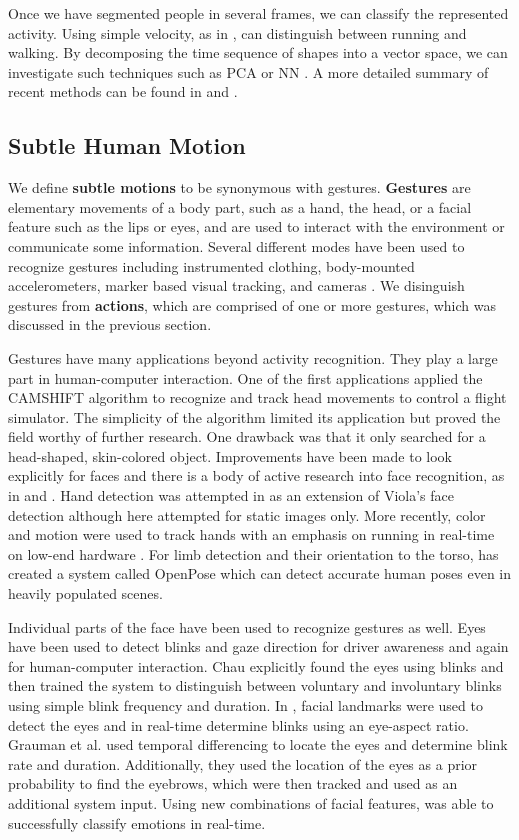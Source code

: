 \documentclass[11pt]{article}
\begin{document}
Once we have segmented people in several frames, we can classify the represented activity. Using simple velocity, as in \cite{bodor2003}, can distinguish between running and walking. By decomposing the time sequence of shapes into a vector space, we can investigate such techniques such as PCA \cite{masoud2003} or NN \cite{blank2005}. A more detailed summary of recent methods can be found in \cite{poppe2010} and \cite{aggarwal2011}.

\subsection{Subtle Human Motion}
We define \textbf{subtle motions} to be synonymous with gestures. \textbf{Gestures} are elementary movements of a body part, such as a hand, the head, or a facial feature such as the lips or eyes, and are used to interact with the environment or communicate some information. Several different modes have been used to recognize gestures including instrumented clothing, body-mounted accelerometers, marker based visual tracking, and cameras \cite{mitra2007}. We disinguish gestures from \textbf{actions}, which are comprised of one or more gestures, which was discussed in the previous section.

Gestures have many applications beyond activity recognition. They play a large part in human-computer interaction. One of the first applications \cite{bradski98} applied the CAMSHIFT algorithm to recognize and track head movements to control a flight simulator. The simplicity of the algorithm limited its application but proved the field worthy of further research. One drawback  was that it \cite{bradski98} only searched for a head-shaped, skin-colored object. Improvements have been made to look explicitly for faces and there is a body of active research into face recognition, as in \cite{cech2014} and \cite{viola2004}. Hand detection was attempted in \cite{kolsch2004} as an extension of Viola's face detection although here attempted for static images only. More recently, color and motion were used to track hands with an emphasis on running in real-time on low-end hardware \cite{liu2017}. For limb detection and their orientation to the torso, \cite{cao2016} has created a system called OpenPose which can detect accurate human poses even in heavily populated scenes.

Individual parts of the face have been used to recognize gestures as well. Eyes have been used to detect blinks and gaze direction for driver awareness and again for human-computer interaction. Chau \cite{chau2005} explicitly found the eyes using blinks and then trained the system to distinguish between voluntary and involuntary blinks using simple blink frequency and duration. In \cite{soukupova2016}, facial landmarks were used to detect the eyes and in real-time determine blinks using an eye-aspect ratio. Grauman et al. \cite{grauman2003} used temporal differencing to locate the eyes and determine blink rate and duration. Additionally, they used the location of the eyes as a prior probability to find the eyebrows, which were then tracked and used as an additional system input. Using new combinations of facial features, \cite{nguyen2017} was able to successfully classify emotions in real-time.
\end{document}
